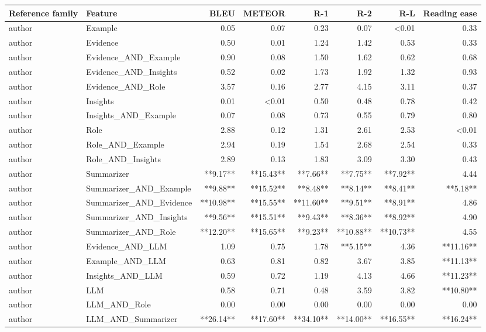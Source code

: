 \begin{tabular}{llrrrrrr}
\toprule
Reference family & Feature & BLEU & METEOR & R-1 & R-2 & R-L & Reading ease \\
\midrule
author & Example & 0.05 & 0.07 & 0.23 & 0.07 & <0.01 & 0.33 \\
author & Evidence & 0.50 & 0.01 & 1.24 & 1.42 & 0.53 & 0.33 \\
author & Evidence_AND_Example & 0.90 & 0.08 & 1.50 & 1.62 & 0.62 & 0.68 \\
author & Evidence_AND_Insights & 0.52 & 0.02 & 1.73 & 1.92 & 1.32 & 0.93 \\
author & Evidence_AND_Role & 3.57 & 0.16 & 2.77 & 4.15 & 3.11 & 0.37 \\
author & Insights & 0.01 & <0.01 & 0.50 & 0.48 & 0.78 & 0.42 \\
author & Insights_AND_Example & 0.07 & 0.08 & 0.73 & 0.55 & 0.79 & 0.80 \\
author & Role & 2.88 & 0.12 & 1.31 & 2.61 & 2.53 & <0.01 \\
author & Role_AND_Example & 2.94 & 0.19 & 1.54 & 2.68 & 2.54 & 0.33 \\
author & Role_AND_Insights & 2.89 & 0.13 & 1.83 & 3.09 & 3.30 & 0.43 \\
author & Summarizer & **9.17** & **15.43** & **7.66** & **7.75** & **7.92** & 4.44 \\
author & Summarizer_AND_Example & **9.88** & **15.52** & **8.48** & **8.14** & **8.41** & **5.18** \\
author & Summarizer_AND_Evidence & **10.98** & **15.55** & **11.60** & **9.51** & **8.91** & 4.86 \\
author & Summarizer_AND_Insights & **9.56** & **15.51** & **9.43** & **8.36** & **8.92** & 4.90 \\
author & Summarizer_AND_Role & **12.20** & **15.65** & **9.23** & **10.88** & **10.73** & 4.55 \\
author & Evidence_AND_LLM & 1.09 & 0.75 & 1.78 & **5.15** & 4.36 & **11.16** \\
author & Example_AND_LLM & 0.63 & 0.81 & 0.82 & 3.67 & 3.85 & **11.13** \\
author & Insights_AND_LLM & 0.59 & 0.72 & 1.19 & 4.13 & 4.66 & **11.23** \\
author & LLM & 0.58 & 0.71 & 0.48 & 3.59 & 3.82 & **10.80** \\
author & LLM_AND_Role & 0.00 & 0.00 & 0.00 & 0.00 & 0.00 & 0.00 \\
author & LLM_AND_Summarizer & **26.14** & **17.60** & **34.10** & **14.00** & **16.55** & **16.24** \\

\end{tabular}
